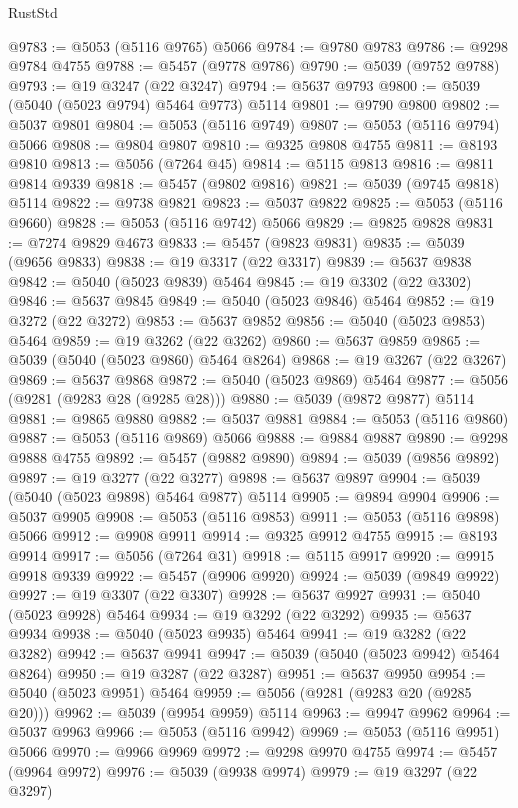 \begin{lexlean}{RustStd}
\begin{coremodule}
@9783 := @5053 (@5116 @9765) @5066
@9784 := @9780 @9783
@9786 := @9298 @9784 @4755
@9788 := @5457 (@9778 @9786)
@9790 := @5039 (@9752 @9788)
@9793 := @19 @3247 (@22 @3247)
@9794 := @5637 @9793
@9800 := @5039 (@5040 (@5023 @9794) @5464 @9773) @5114
@9801 := @9790 @9800
@9802 := @5037 @9801
@9804 := @5053 (@5116 @9749)
@9807 := @5053 (@5116 @9794) @5066
@9808 := @9804 @9807
@9810 := @9325 @9808 @4755
@9811 := @8193 @9810
@9813 := @5056 (@7264 @45)
@9814 := @5115 @9813
@9816 := @9811 @9814 @9339
@9818 := @5457 (@9802 @9816)
@9821 := @5039 (@9745 @9818) @5114
@9822 := @9738 @9821
@9823 := @5037 @9822
@9825 := @5053 (@5116 @9660)
@9828 := @5053 (@5116 @9742) @5066
@9829 := @9825 @9828
@9831 := @7274 @9829 @4673
@9833 := @5457 (@9823 @9831)
@9835 := @5039 (@9656 @9833)
@9838 := @19 @3317 (@22 @3317)
@9839 := @5637 @9838
@9842 := @5040 (@5023 @9839) @5464
@9845 := @19 @3302 (@22 @3302)
@9846 := @5637 @9845
@9849 := @5040 (@5023 @9846) @5464
@9852 := @19 @3272 (@22 @3272)
@9853 := @5637 @9852
@9856 := @5040 (@5023 @9853) @5464
@9859 := @19 @3262 (@22 @3262)
@9860 := @5637 @9859
@9865 := @5039 (@5040 (@5023 @9860) @5464 @8264)
@9868 := @19 @3267 (@22 @3267)
@9869 := @5637 @9868
@9872 := @5040 (@5023 @9869) @5464
@9877 := @5056 (@9281 (@9283 @28 (@9285 @28)))
@9880 := @5039 (@9872 @9877) @5114
@9881 := @9865 @9880
@9882 := @5037 @9881
@9884 := @5053 (@5116 @9860)
@9887 := @5053 (@5116 @9869) @5066
@9888 := @9884 @9887
@9890 := @9298 @9888 @4755
@9892 := @5457 (@9882 @9890)
@9894 := @5039 (@9856 @9892)
@9897 := @19 @3277 (@22 @3277)
@9898 := @5637 @9897
@9904 := @5039 (@5040 (@5023 @9898) @5464 @9877) @5114
@9905 := @9894 @9904
@9906 := @5037 @9905
@9908 := @5053 (@5116 @9853)
@9911 := @5053 (@5116 @9898) @5066
@9912 := @9908 @9911
@9914 := @9325 @9912 @4755
@9915 := @8193 @9914
@9917 := @5056 (@7264 @31)
@9918 := @5115 @9917
@9920 := @9915 @9918 @9339
@9922 := @5457 (@9906 @9920)
@9924 := @5039 (@9849 @9922)
@9927 := @19 @3307 (@22 @3307)
@9928 := @5637 @9927
@9931 := @5040 (@5023 @9928) @5464
@9934 := @19 @3292 (@22 @3292)
@9935 := @5637 @9934
@9938 := @5040 (@5023 @9935) @5464
@9941 := @19 @3282 (@22 @3282)
@9942 := @5637 @9941
@9947 := @5039 (@5040 (@5023 @9942) @5464 @8264)
@9950 := @19 @3287 (@22 @3287)
@9951 := @5637 @9950
@9954 := @5040 (@5023 @9951) @5464
@9959 := @5056 (@9281 (@9283 @20 (@9285 @20)))
@9962 := @5039 (@9954 @9959) @5114
@9963 := @9947 @9962
@9964 := @5037 @9963
@9966 := @5053 (@5116 @9942)
@9969 := @5053 (@5116 @9951) @5066
@9970 := @9966 @9969
@9972 := @9298 @9970 @4755
@9974 := @5457 (@9964 @9972)
@9976 := @5039 (@9938 @9974)
@9979 := @19 @3297 (@22 @3297)

\end{coremodule}
\end{lexlean}

